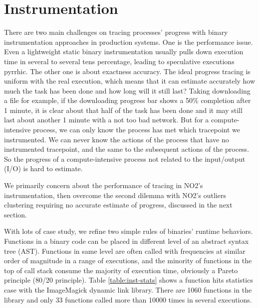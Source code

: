 \section{Instrumentation}

There are two main challenges on tracing processes' progress with binary instrumentation approaches in production systems. One is the performance issue. Even a lightweight static binary instrumentation usually pulls down execution time in several to several tens percentage, leading to speculative executions pyrrhic.  The other one is about exactness accuracy. The ideal progress tracing is uniform with the real execution, which means that it can estimate accurately how much the task has been done and how long will it still last? Taking downloading a file for example, if the downloading progress bar shows a 50\% completion after 1 minute, it is clear about that half of the task has been done and it may still last about another 1 minute with a not too bad network. But for a compute-intensive process, we can only know the process has met which tracepoint we instrumented. We can never know the actions of the process that have no instrumented tracepoint, and the same to the subsequent actions of the process. So the progress of a compute-intensive process not related to the input/output (I/O) is hard to estimate.

We primarily concern about the performance of tracing in NO2's instrumentation, then overcome the second dilemma with NO2's outliers clustering requiring no accurate estimate of progress, discussed in the next section.

With lots of case study, we refine two simple rules of binaries' runtime behaviors. Functions in a binary code can be placed in different level of an abstract syntax tree (AST). Functions in same level are often called with frequencies at similar order of magnitude in a range of executions, and the minority of functions in the top of call stack consume the majority of execution time, obviously a Pareto principle (80/20 principle). Table \ref{table:inst-stats} shows a function hits statistics case with the ImageMagick dynamic link library. There are 1060 functions in the library and only 33 functions called more than 10000 times in several executions.

